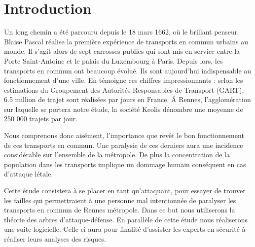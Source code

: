 \section{Introduction}
    Un long chemin a été parcouru depuis le 18 mars 1662, où le brillant penseur Blaise Pascal réalise la première expérience de transports en commun urbains au monde. Il s'agit alors de sept carrosses publics qui sont mis en service entre la Porte Saint-Antoine et le palais du Luxembourg à Paris. Depuis lors, les transports en commun ont beaucoup évolué. Ils sont aujourd'hui indispensable au fonctionnement d'une ville. En témoigne ces chiffres impressionnants : selon les estimations du Groupement des Autorités Responsables de Transport (GART), 6.5 million de trajet sont réalisées par jours en France. \'A Rennes, l'agglomération sur laquelle se portera notre étude, la société Keolis dénombre une moyenne de 250 000 trajets par jour.
    
    Nous comprenons donc aisément, l'importance que revêt le bon fonctionnement de ces transports en commun. Une paralysie de ces derniers aura une incidence considérable sur l'ensemble de la métropole. 
    De plus la concentration de la population dans les transports implique un dommage humain conséquent en cas d'attaque létale. %
    
    Cette étude consistera à se placer en tant qu'attaquant, pour essayer de trouver les failles qui permettraient à une personne mal intentionnée de paralyser les transports en commun de Rennes métropole. 
    Dans ce but nous utiliserons la théorie des arbres d'attaque-défense. 
    En parallèle de cette étude nous réaliserons une suite logicielle. Celle-ci aura pour finalité d'assister les experts en sécurité à réaliser leurs analyses des risques.

